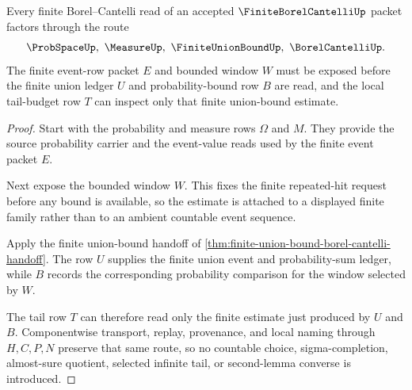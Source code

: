 \begin{theorem}
\label{thm:finite-borel-cantelli-union-bound-route}
Every finite Borel--Cantelli read of an accepted $\FiniteBorelCantelliUp$ packet factors through the route
$$
\ProbSpaceUp,\ \MeasureUp,\ \FiniteUnionBoundUp,\ \BorelCantelliUp .
$$
The finite event-row packet $E$ and bounded window $W$ must be exposed before the finite union ledger $U$ and probability-bound row $B$ are read, and the local tail-budget row $T$ can inspect only that finite union-bound estimate.
\end{theorem}
\begin{proof}
Start with the probability and measure rows $\Omega$ and $M$. They provide the source probability carrier and the event-value reads used by the finite event packet $E$.

Next expose the bounded window $W$. This fixes the finite repeated-hit request before any bound is available, so the estimate is attached to a displayed finite family rather than to an ambient countable event sequence.

Apply the finite union-bound handoff of \autoref{thm:finite-union-bound-borel-cantelli-handoff}. The row $U$ supplies the finite union event and probability-sum ledger, while $B$ records the corresponding probability comparison for the window selected by $W$.

The tail row $T$ can therefore read only the finite estimate just produced by $U$ and $B$. Componentwise transport, replay, provenance, and local naming through $H,C,P,N$ preserve that same route, so no countable choice, sigma-completion, almost-sure quotient, selected infinite tail, or second-lemma converse is introduced.
\end{proof}


\begin{closurestatus}{\FiniteBorelCantelliUp}
  \theoryclosure{\seedClosure}
  \formalstatus{\unformalizedV}
\end{closurestatus}
